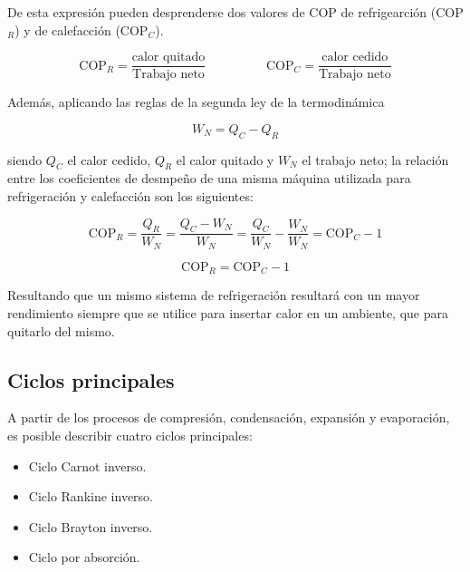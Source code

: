 	De esta expresión pueden desprenderse dos valores de COP de refrigearción (COP$_R$) y de calefacción (COP$_C$).

	\begin{equation}\label{E1-Coeficiente de desempeño (COP)}
		\text{COP}_{R} = \dfrac{\text{calor quitado}}{\text{Trabajo neto}} \hspace{2cm} \text{COP}_{C} = \dfrac{\text{calor cedido}}{\text{Trabajo neto}}
	\end{equation}

	Además, aplicando las reglas de la segunda ley de la termodinámica

	\begin{equation}\nonumber
		W_N = Q_C - Q_R
	\end{equation}

	\noindent siendo $Q_C$ el calor cedido, $Q_R$ el calor quitado y $W_N$ el trabajo neto; la relación entre los coeficientes de desmpeño de una misma máquina utilizada para refrigeración y calefacción son los siguientes:

	\begin{equation}\nonumber
		\text{COP}_R = \dfrac{Q_R}{W_N} = \dfrac{Q_C - W_N}{W_N}  = \dfrac{Q_C}{W_N} - \dfrac{W_N}{W_N} =  \text{COP}_{C} - 1
	\end{equation}

	\begin{equation}\label{E1-Relación entre coeficientes de desempeño}
		\text{COP}_R = \text{COP}_{C} - 1
	\end{equation}

	Resultando que un mismo sistema de refrigeración resultará con un mayor rendimiento siempre que se utilice para insertar calor en un ambiente, que para quitarlo del mismo.

	\subsection{Ciclos principales}

	A partir de los procesos de compresión, condensación, expansión y evaporación, es posible describir cuatro ciclos principales:

	\begin{itemize}
		\item Ciclo Carnot inverso.
		\item Ciclo Rankine inverso.
		\item Ciclo Brayton inverso.
		\item Ciclo por absorción.
	\end{itemize}

